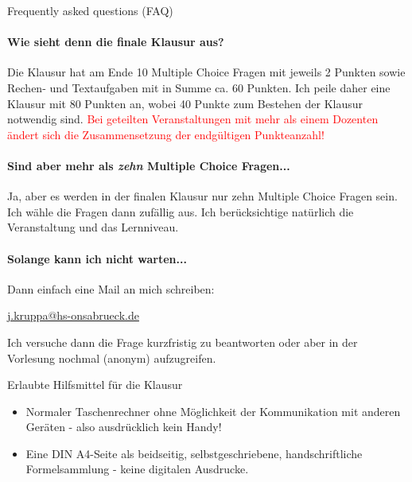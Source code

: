 \documentclass[a4paper, 10pt]{scrartcl}\usepackage[]{graphicx}\usepackage[]{xcolor}
\begin{document}
\begin{takehomebox}{Frequently asked questions (FAQ)}
  \paragraph{Wie sieht denn die finale Klausur aus?} Die Klausur hat am
  Ende 10 Multiple Choice Fragen mit jeweils 2 Punkten sowie Rechen- und
  Textaufgaben mit in Summe ca. 60 Punkten. Ich peile daher eine Klausur
  mit 80 Punkten an, wobei 40 Punkte zum Bestehen der Klausur notwendig
  sind. \textcolor{red}{Bei geteilten Veranstaltungen
    mit mehr als einem Dozenten {\"a}ndert sich die Zusammensetzung der
    endg{\"u}ltigen Punkteanzahl!}
  \vspace{1Ex}
  \paragraph{Sind aber mehr als \textit{zehn} Multiple Choice Fragen...} Ja,
  aber es werden in der finalen Klausur nur zehn Multiple Choice Fragen
  sein. Ich w{\"a}hle die Fragen dann zuf{\"a}llig aus. Ich ber{\"u}cksichtige
  nat{\"u}rlich die Veranstaltung und das Lernniveau.
  \vspace{1Ex}
  \paragraph{Solange kann ich nicht warten...} Dann einfach eine Mail an
  mich schreiben:
  \begin{center}
    \url{j.kruppa@hs-onsabrueck.de}
  \end{center}
  Ich versuche dann die Frage kurzfristig zu beantworten oder
  aber in der Vorlesung nochmal (anonym) aufzugreifen.
\end{takehomebox}

\maketitle
\thispagestyle{empty}
\clearpage

\begin{graybox}{Erlaubte Hilfsmittel f{\"u}r die Klausur}
  \vspace{1Ex}
  \begin{itemize}
  \item Normaler Taschenrechner ohne M{\"o}glichkeit der Kommunikation mit anderen
    Ger{\"a}ten - also ausdr{\"u}cklich kein Handy!
  \item Eine DIN A4-Seite als beidseitig, selbstgeschriebene,
    handschriftliche Formelsammlung - keine digitalen Ausdrucke. 
  \end{itemize}
\end{graybox}
\vfill
\end{document}
